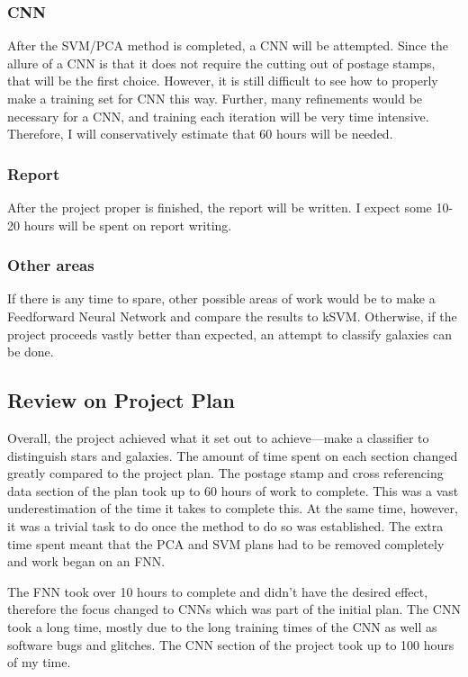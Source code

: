 \documentclass[a4paper,fleqn,usenatbib]{mnras}
\begin{document}
\subsubsection{CNN}
After the SVM/PCA method is completed, a CNN will be attempted. Since the allure of a CNN is that it does not require the cutting out of postage stamps, that will be the first choice. However, it is still difficult to see how to properly make a training set for CNN this way. Further, many refinements would be necessary for a CNN, and training each iteration will be very time intensive. Therefore, I will conservatively estimate that 60 hours will be needed.
\subsubsection{Report}
After the project proper is finished, the report will be written. I expect some 10-20 hours will be spent on report writing.
\subsubsection{Other areas}
If there is any time to spare, other possible areas of work would be to make a Feedforward Neural Network and compare the results to kSVM. Otherwise, if the project proceeds vastly better than expected, an attempt to classify galaxies can be done.

\subsection{Review on Project Plan}
Overall, the project achieved what it set out to achieve---make a classifier to distinguish stars and galaxies. The amount of time spent on each section changed greatly compared to the project plan. The postage stamp and cross referencing data section of the plan took up to 60 hours of work to complete. This was a vast underestimation of the time it takes to complete this. At the same time, however, it was a trivial task to do once the method to do so was established. The extra time spent meant that the PCA and SVM plans had to be removed completely and work began on an FNN. 

The FNN took over 10 hours to complete and didn't have the desired effect, therefore the focus changed to CNNs which was part of the initial plan. The CNN took a long time, mostly due to the long training times of the CNN as well as software bugs and glitches. The CNN section of the project took up to 100 hours of my time.
\end{document}
